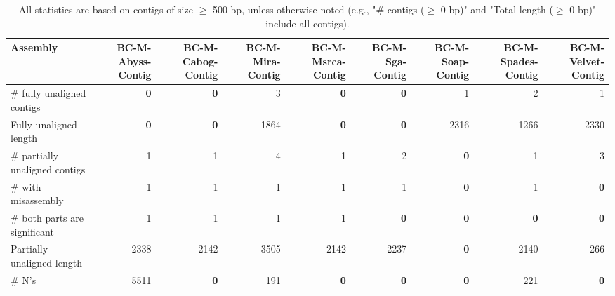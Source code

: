 \documentclass[12pt,a4paper]{article}
\begin{document}
\begin{table}[ht]
\begin{center}
\caption{All statistics are based on contigs of size $\geq$ 500 bp, unless otherwise noted (e.g., "\# contigs ($\geq$ 0 bp)" and "Total length ($\geq$ 0 bp)" include all contigs).}
\begin{tabular}{|l*{8}{|r}|}
\hline
Assembly & BC-M-Abyss-Contig & BC-M-Cabog-Contig & BC-M-Mira-Contig & BC-M-Msrca-Contig & BC-M-Sga-Contig & BC-M-Soap-Contig & BC-M-Spades-Contig & BC-M-Velvet-Contig \\ \hline
\# fully unaligned contigs & {\bf 0} & {\bf 0} & 3 & {\bf 0} & {\bf 0} & 1 & 2 & 1 \\ \hline
Fully unaligned length & {\bf 0} & {\bf 0} & 1864 & {\bf 0} & {\bf 0} & 2316 & 1266 & 2330 \\ \hline
\# partially unaligned contigs & 1 & 1 & 4 & 1 & 2 & {\bf 0} & 1 & 3 \\ \hline
\hspace{5mm}\# with misassembly & 1 & 1 & 1 & 1 & 1 & {\bf 0} & 1 & {\bf 0} \\ \hline
\hspace{5mm}\# both parts are significant & 1 & 1 & 1 & 1 & {\bf 0} & {\bf 0} & {\bf 0} & {\bf 0} \\ \hline
Partially unaligned length & 2338 & 2142 & 3505 & 2142 & 2237 & {\bf 0} & 2140 & 266 \\ \hline
\# N's & 5511 & {\bf 0} & 191 & {\bf 0} & {\bf 0} & {\bf 0} & 221 & {\bf 0} \\ \hline
\end{tabular}
\end{center}
\end{table}
\end{document}
